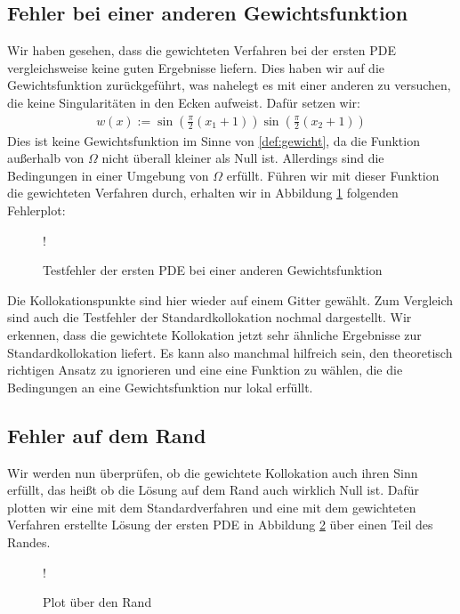 \subsection{Fehler bei einer anderen Gewichtsfunktion}
\label{sec:andereGewicht}
Wir haben gesehen, dass die gewichteten Verfahren bei der ersten \ac{PDE} vergleichsweise keine guten Ergebnisse liefern. Dies haben wir auf die Gewichtsfunktion zurückgeführt, was nahelegt es mit einer anderen zu versuchen, die keine Singularitäten in den Ecken aufweist. Dafür setzen wir:
\begin{align*}
	w(x) := \sin\left(\frac{\pi}{2}(x_1+1)\right) \sin\left(\frac{\pi}{2}(x_2+1)\right)
\end{align*}
Dies ist keine Gewichtsfunktion im Sinne von \ref{def:gewicht}, da die Funktion außerhalb von $\Omega$ nicht überall kleiner als Null ist. Allerdings sind die Bedingungen in einer Umgebung von $\Omega$ erfüllt. Führen wir mit dieser Funktion die gewichteten Verfahren durch, erhalten wir in Abbildung \ref{fig:andereGewicht} folgenden Fehlerplot:
\begin{figure}[H]
	\centering
	\resizebox {\columnwidth} {!} {
		
	}
	\caption{Testfehler der ersten \acs{PDE} bei einer anderen Gewichtsfunktion}
	\label{fig:andereGewicht}
\end{figure}
Die Kollokationspunkte sind hier wieder auf einem Gitter gewählt. Zum Vergleich sind auch die Testfehler der Standardkollokation nochmal dargestellt. Wir erkennen, dass die gewichtete Kollokation jetzt sehr ähnliche Ergebnisse zur Standardkollokation liefert. Es kann also manchmal hilfreich sein, den theoretisch richtigen Ansatz zu ignorieren und eine eine Funktion zu wählen, die die Bedingungen an eine Gewichtsfunktion nur lokal erfüllt.

\subsection{Fehler auf dem Rand}
Wir werden nun überprüfen, ob die gewichtete Kollokation auch ihren Sinn erfüllt, das heißt ob die Lösung auf dem Rand auch wirklich Null ist. Dafür plotten wir eine mit dem Standardverfahren und eine mit dem gewichteten Verfahren erstellte Lösung der ersten \ac{PDE} in Abbildung \ref{fig:rand-vergleich} über einen Teil des Randes.

\begin{figure}[ht]
\centering
\resizebox {\columnwidth} {!} {

}
\caption{Plot über den Rand}
\label{fig:rand-vergleich}
\end{figure}


